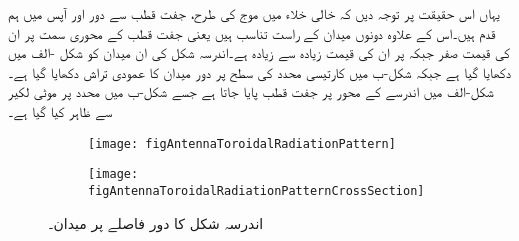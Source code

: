 یہاں اس حقیقت پر توجہ دیں کہ خالی خلاء میں  موج کی طرح، جفت قطب سے دور  اور   آپس میں ہم قدم ہیں۔اس کے علاوہ دونوں میدان   کے راست تناسب ہیں یعنی جفت قطب کے محوری سمت  پر ان کی قیمت صفر جبکہ  پر ان کی قیمت زیادہ سے زیادہ ہے۔اندرسہ شکل کی ان میدان کو شکل -الف میں دکھایا گیا ہے جبکہ شکل-ب میں  کارتیسی  محدد کی سطح  پر دور میدان کا عمودی تراش دکھایا گیا ہے۔شکل-الف میں اندرسے کے محور پر جفت قطب پایا جاتا ہے جسے شکل-ب میں  محدد پر موٹی لکیر سے ظاہر کیا گیا ہے۔ 

\begin{figure}
\centering
\begin{subfigure}{0.5\textwidth}
\centering
\texttt{[image: figAntennaToroidalRadiationPattern]}
\caption{}
\end{subfigure}%
%
\begin{subfigure}{0.5\textwidth}
\centering
\texttt{[image: figAntennaToroidalRadiationPatternCrossSection]}
\caption{}
\end{subfigure}%
\caption{اندرسہ شکل کا دور فاصلے پر میدان۔}
\label{شکل_اینٹینا_اندرسہ_دور_میدان}
\end{figure}

